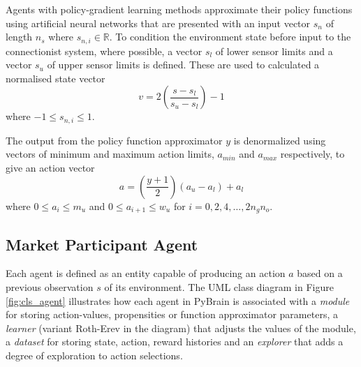 
Agents with policy-gradient learning methods approximate their policy functions
using artificial neural networks that are presented with an input vector $s_n$
of length $n_s$ where $s_{n,i} \in \mathbb{R}$.  To condition the environment
state before input to the connectionist system, where possible, a vector $s_{l}$
of lower sensor limits and a vector $s_{u}$ of upper sensor limits is
defined.  These are used to calculated a normalised state vector
\begin{equation}
v = 2\left(\frac{s - s_{l}}{s_{u} - s_{l}}\right) - 1
\end{equation}
where $-1 \leq s_{n,i} \leq 1$.

The output from the policy function approximator $y$ is denormalized using
vectors of minimum and maximum action limits, $a_{min}$ and $a_{max}$
respectively, to give an action vector
\begin{equation}
a = \left(\frac{y + 1}{2}\right)(a_{u} - a_{l}) + a_{l}
\end{equation}
where $0\leq a_i \leq m_{u}$ and $0\leq a_{i+1} \leq w_{u}$ for $i=0,2,4,
\dotsc, 2n_gn_o$.

\subsection{Market Participant Agent}
Each agent is defined as an entity capable of producing an action $a$
based on a previous observation $s$ of its environment.
The UML class diagram in Figure \ref{fig:cls_agent} illustrates how each agent
in PyBrain is associated with a \textit{module} for storing action-values,
propensities or function approximator parameters, a \textit{learner} (variant
Roth-Erev in the diagram) that adjusts the values of the module, a
\textit{dataset} for storing state, action, reward histories and an
\textit{explorer} that adds a degree of exploration to action selections.


